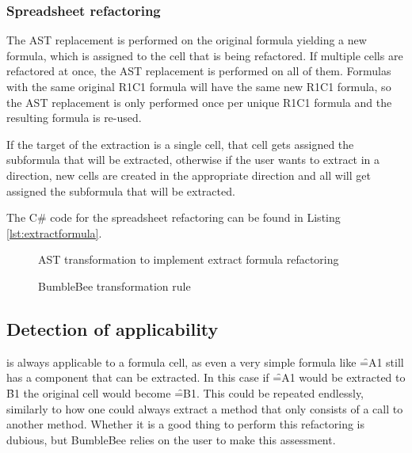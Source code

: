 \subsubsection{Spreadsheet refactoring}

The AST replacement is performed on the original formula yielding a new formula, which is assigned to the cell that is being refactored.
If multiple cells are refactored at once, the AST replacement is performed on all of them.
Formulas with the same original R1C1 formula will have the same new R1C1 formula, so the AST replacement is only performed once per unique R1C1 formula and the resulting formula is re-used.

If the target of the extraction is a single cell, that cell gets assigned the subformula that will be extracted, otherwise if the user wants to extract in a direction, new cells are created in the appropriate direction and all will get assigned the subformula that will be extracted.

The C\# code for the spreadsheet refactoring can be found in Listing \ref{lst:extractformula}.

\begin{figure}
	\centering
	
	\caption{AST transformation to implement extract formula refactoring}
	\label{fig:extractformulaASTtransformations}
\end{figure}

\begin{figure}
	\centering
	
	\caption{BumbleBee transformation rule}
	\label{fig:bbv1transformationrule}
\end{figure}

\newpage

\subsection{Detection of applicability}

 is always applicable to a formula cell, as even a very simple formula like \f{=A1} still has a component that can be extracted.
In this case if \f{=A1} would be extracted to \f{B1} the original cell would become \f{=B1}.
This could be repeated endlessly, similarly to how one could always extract a method that only consists of a call to another method.
Whether it is a good thing to perform this refactoring is dubious, but BumbleBee relies on the user to make this assessment.

